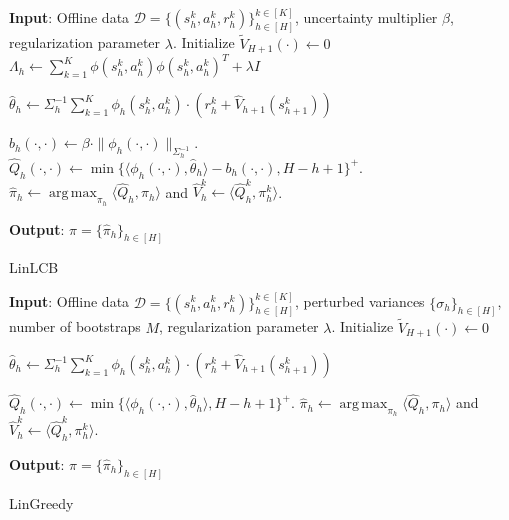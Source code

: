 \documentclass{article} \usepackage{iclr2023/iclr2023_conference,times}
\DeclareMathOperator*{\argmax}{arg\,max}
\begin{document}
\begin{algorithm}[h!]
\begin{algorithmic}[1]
\State \textbf{Input}: Offline data $ \mathcal{D} = \{(s_h^k, a_h^k, r_h^k)\}_{h \in [H]}^{k \in [K]} $, uncertainty multiplier $\beta$, regularization parameter $\lambda$. 
\State Initialize $\tilde{V}_{H+1}(\cdot) \leftarrow 0$
\State $\Lambda_h \leftarrow \sum_{k=1}^K \phi(s^k_h, a^k_h) \phi(s^k_h, a^k_h)^T + \lambda I$


\State $\hat{\theta}_h \leftarrow \Sigma_h^{-1} \sum_{k=1}^{K} \phi_h(s_h^k, a_h^k) \cdot (r^k_h + \hat{V}_{h+1}(s^k_{h+1}))$

 \State $b_h(\cdot,\cdot) \leftarrow \beta \cdot  \| \phi_h(\cdot, \cdot) \|_{\Sigma_h^{-1}}$. 
\label{bpvi:lcb}
\State $\hat{Q}_h(\cdot, \cdot) \leftarrow \min\{\langle \phi_h(\cdot, \cdot), \hat{\theta}_h \rangle - b_h(\cdot, \cdot), H - h +1\}^+$. 
\State $\hat{\pi}_h \leftarrow  \argmax_{\pi_h } \langle \hat{Q}_h, \pi_h \rangle$ and $\hat{V}_h^k \leftarrow \langle \hat{Q}_h^k, \pi_h^k \rangle$.





\EndFor
\State \textbf{Output}: $\hat{\pi} = \{ \hat{\pi}_h \}_{h \in [H]}$
\end{algorithmic}
\caption{LinLCB \citep{jin2021pessimism}}
\label{algorithm: LinLCB}
\end{algorithm}

\begin{algorithm}[h!]
\begin{algorithmic}[1]
\State \textbf{Input}: Offline data $ \mathcal{D} = \{(s_h^k, a_h^k, r_h^k)\}_{h \in [H]}^{k \in [K]} $, perturbed variances $\{\sigma_h\}_{h \in [H]}$, number of bootstraps $M$, regularization parameter $\lambda$. 
\State Initialize $\tilde{V}_{H+1}(\cdot) \leftarrow 0$


\State $\hat{\theta}_h \leftarrow \Sigma_h^{-1} \sum_{k=1}^{K} \phi_h(s_h^k, a_h^k) \cdot (r^k_h + \hat{V}_{h+1}(s^k_{h+1}))$

\label{bpvi:lcb}
\State $\hat{Q}_h(\cdot, \cdot) \leftarrow \min\{\langle \phi_h(\cdot, \cdot), \hat{\theta}_h \rangle, H - h +1\}^+$. 
\State $\hat{\pi}_h \leftarrow  \argmax_{\pi_h } \langle \hat{Q}_h, \pi_h \rangle$ and $\hat{V}_h^k \leftarrow \langle \hat{Q}_h^k, \pi_h^k \rangle$.





\EndFor
\State \textbf{Output}: $\hat{\pi} = \{ \hat{\pi}_h \}_{h \in [H]}$
\end{algorithmic}
\caption{LinGreedy}
\label{algorithm: LinGreedy}
\end{algorithm}
\end{document}
